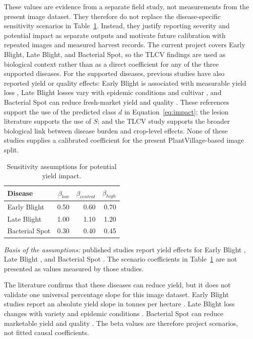 \documentclass[12pt,a4paper]{article}
\begin{document}
These values are evidence from a separate field study, not measurements from the present
image dataset. They therefore do not replace the disease-specific sensitivity scenarios in
Table~\ref{tab:beta}. Instead, they justify reporting severity and potential impact as
separate outputs and motivate future calibration with repeated images and measured harvest
records. The current project covers Early Blight, Late Blight, and Bacterial Spot, so the
TLCV findings are used as biological context rather than as a direct coefficient for any
of the three supported diseases. For the supported diseases, previous studies have also
reported yield or quality effects: Early Blight is associated with measurable yield loss
\cite{saha2012earlyblight}, Late Blight losses vary with epidemic conditions and cultivar
\cite{fontem2003blights,nowicki2012lateblight}, and Bacterial Spot can reduce fresh-market
yield and quality \cite{pohronezny1983bacterialspot}. These references support the use of
the predicted class $d$ in Equation~\ref{eq:impact}; the lesion literature supports the use
of $S$; and the TLCV study supports the broader biological link between disease burden and
crop-level effects. None of these studies supplies a calibrated coefficient for the
present PlantVillage-based image split.

\begin{table}[H]
\centering
\caption{Sensitivity assumptions for potential yield impact.}
\label{tab:beta}
\begin{tabular}{lrrr}
\toprule
Disease & $\beta_{low}$ & $\beta_{central}$ & $\beta_{high}$\\
\midrule
Early Blight & 0.50 & 0.60 & 0.70\\
Late Blight & 1.00 & 1.10 & 1.20\\
Bacterial Spot & 0.30 & 0.40 & 0.45\\
\bottomrule
\end{tabular}
\end{table}

\noindent\textit{Basis of the assumptions:} published studies report yield effects for
Early Blight \cite{saha2012earlyblight}, Late Blight
\cite{fontem2003blights,nowicki2012lateblight}, and Bacterial Spot
\cite{pohronezny1983bacterialspot}. The scenario coefficients in
Table~\ref{tab:beta} are not presented as values measured by those studies.

The literature confirms that these diseases can reduce yield, but it does not validate one
universal percentage slope for this image dataset. Early Blight studies report an absolute
yield slope in tonnes per hectare \cite{saha2012earlyblight}. Late Blight loss changes with
variety and epidemic conditions \cite{fontem2003blights,nowicki2012lateblight}. Bacterial
Spot can reduce marketable yield and quality \cite{pohronezny1983bacterialspot}. The beta
values are therefore project scenarios, not fitted causal coefficients.
\end{document}
